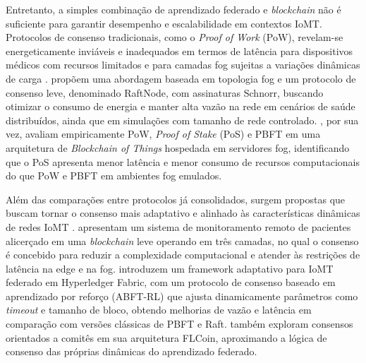 \documentclass[12pt]{article}
\begin{document}
Entretanto, a simples combinação de aprendizado federado e \textit{blockchain} não é suficiente para garantir desempenho e escalabilidade em contextos IoMT. Protocolos de consenso tradicionais, como o \textit{Proof of Work} (PoW), revelam-se energeticamente inviáveis e inadequados em termos de latência para dispositivos médicos com recursos limitados e para camadas fog sujeitas a variações dinâmicas de carga \cite{laouamri2025,aljoboury2020}. \cite{laouamri2025} propõem uma abordagem baseada em topologia fog e um protocolo de consenso leve, denominado RaftNode, com assinaturas Schnorr, buscando otimizar o consumo de energia e manter alta vazão na rede em cenários de saúde distribuídos, ainda que em simulações com tamanho de rede controlado. \cite{aljoboury2020}, por sua vez, avaliam empiricamente PoW, \textit{Proof of Stake} (PoS) e PBFT em uma arquitetura de \textit{Blockchain of Things} hospedada em servidores fog, identificando que o PoS apresenta menor latência e menor consumo de recursos computacionais do que PoW e PBFT em ambientes fog emulados.

Além das comparações entre protocolos já consolidados, surgem propostas que buscam tornar o consenso mais adaptativo e alinhado às características dinâmicas de redes IoMT \cite{cheikhrouhou2023,murthy2026,ren2024}. \cite{cheikhrouhou2023} apresentam um sistema de monitoramento remoto de pacientes alicerçado em uma \textit{blockchain} leve operando em três camadas, no qual o consenso é concebido para reduzir a complexidade computacional e atender às restrições de latência na edge e na fog. \cite{murthy2026} introduzem um framework adaptativo para IoMT federado em Hyperledger Fabric, com um protocolo de consenso baseado em aprendizado por reforço (ABFT-RL) que ajusta dinamicamente parâmetros como \textit{timeout} e tamanho de bloco, obtendo melhorias de vazão e latência em comparação com versões clássicas de PBFT e Raft. \cite{ren2024} também exploram consensos orientados a comitês em sua arquitetura FLCoin, aproximando a lógica de consenso das próprias dinâmicas do aprendizado federado.
\end{document}
